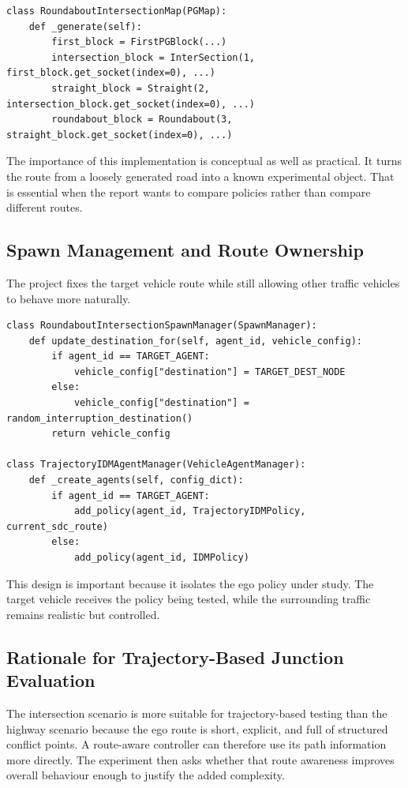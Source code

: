 \documentclass[12pt,a4paper]{report}
\begin{document}
\begin{lstlisting}[caption={Custom block sequence for the intersection-roundabout map.},label={lst:intersection_map},float=H]
class RoundaboutIntersectionMap(PGMap):
    def _generate(self):
        first_block = FirstPGBlock(...)
        intersection_block = InterSection(1, first_block.get_socket(index=0), ...)
        straight_block = Straight(2, intersection_block.get_socket(index=0), ...)
        roundabout_block = Roundabout(3, straight_block.get_socket(index=0), ...)
\end{lstlisting}

The importance of this implementation is conceptual as well as practical. It turns the route from a loosely generated road into a known experimental object. That is essential when the report wants to compare policies rather than compare different routes.

\subsection{Spawn Management and Route Ownership}
The project fixes the target vehicle route while still allowing other traffic vehicles to behave more naturally.

\begin{lstlisting}[caption={Target-route control and surrounding-traffic assignment in the intersection scenario.},label={lst:intersection_agent_assign},float=H]
class RoundaboutIntersectionSpawnManager(SpawnManager):
    def update_destination_for(self, agent_id, vehicle_config):
        if agent_id == TARGET_AGENT:
            vehicle_config["destination"] = TARGET_DEST_NODE
        else:
            vehicle_config["destination"] = random_interruption_destination()
        return vehicle_config

class TrajectoryIDMAgentManager(VehicleAgentManager):
    def _create_agents(self, config_dict):
        if agent_id == TARGET_AGENT:
            add_policy(agent_id, TrajectoryIDMPolicy, current_sdc_route)
        else:
            add_policy(agent_id, IDMPolicy)
\end{lstlisting}

This design is important because it isolates the ego policy under study. The target vehicle receives the policy being tested, while the surrounding traffic remains realistic but controlled.

\subsection{Rationale for Trajectory-Based Junction Evaluation}
The intersection scenario is more suitable for trajectory-based testing than the highway scenario because the ego route is short, explicit, and full of structured conflict points. A route-aware controller can therefore use its path information more directly. The experiment then asks whether that route awareness improves overall behaviour enough to justify the added complexity.
\end{document}
